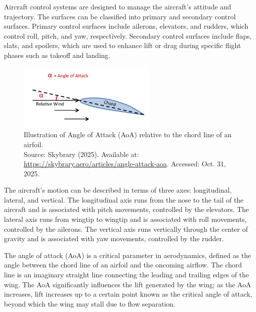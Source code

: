 Aircraft control systems are designed to manage the aircraft's attitude and trajectory. The surfaces can be classified into primary and secondary control surfaces. Primary control surfaces include ailerons, elevators, and rudders, which control roll, pitch, and yaw, respectively. Secondary control surfaces include flaps, slats, and spoilers, which are used to enhance lift or drag during specific flight phases such as takeoff and landing.

\begin{figure}[H]
    \centering
    \includegraphics[width=0.6\textwidth]{figures/angle_of_attack.jpg}
    \caption{Illustration of Angle of Attack (AoA) relative to the chord line of an airfoil. \\ Source: Skybrary (2025). Available at: \url{https://skybrary.aero/articles/angle-attack-aoa}. Accessed: Oct. 31, 2025.}
    \label{fig:angle_of_attack}
\end{figure}

The aircraft's motion can be described in terms of three axes: longitudinal, lateral, and vertical. The longitudinal axis runs from the nose to the tail of the aircraft and is associated with pitch movements, controlled by the elevators. The lateral axis runs from wingtip to wingtip and is associated with roll movements, controlled by the ailerons. The vertical axis runs vertically through the center of gravity and is associated with yaw movements, controlled by the rudder.

The angle of attack (AoA) is a critical parameter in aerodynamics, defined as the angle between the chord line of an airfoil and the oncoming airflow. The chord line is an imaginary straight line connecting the leading and trailing edges of the wing. The AoA significantly influences the lift generated by the wing; as the AoA increases, lift increases up to a certain point known as the critical angle of attack, beyond which the wing may stall due to flow separation.

